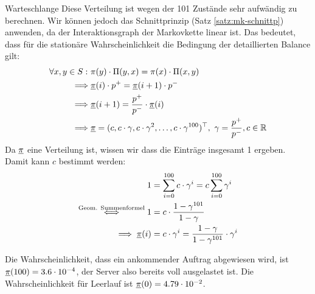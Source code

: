 \begin{example}{Warteschlange}{}
Diese Verteilung ist wegen der 101 Zustände sehr aufwändig zu berechnen. Wir
können jedoch das Schnittprinzip (Satz \ref{satz:mk-schnittp}) anwenden, da der
Interaktionsgraph der Markovkette linear ist. Das bedeutet, dass für die
stationäre Wahrscheinlichkeit die Bedingung der detaillierten Balance gilt:
\begin{align*}
\forall x,y\in S:\ &\pi(y)\cdot\Pi(y,x) = \pi(x)\cdot\Pi(x,y) \\
\implies&\underline{\pi}(i)\cdot p^+ = \underline{\pi}(i+1)\cdot p^- \\
\implies&\underline{\pi}(i+1) = \frac{p^+}{p^-}\cdot\underline{\pi}(i) \\
\implies&\underline{\pi} = (c, c\cdot\gamma,c\cdot\gamma^2,\ldots,
c\cdot\gamma^{100})^{\top},\ \gamma = \frac{p^+}{p^-}, c\in\mathbb{R}
\end{align*}
Da $\underline{\pi}$ eine Verteilung ist, wissen wir dass die Einträge insgesamt 1
ergeben. Damit kann $c$ bestimmt werden:
\begin{align*}
1 &= \sum_{i=0}^{100}c\cdot\gamma^i = c \sum_{i=0}^{100}\gamma^i \\
\overset{\text{Geom. Summenformel}}{\iff} 1 &= c\cdot\frac{1-\gamma^{101}}{1-\gamma} \\
\implies \underline{\pi}(i) &= c\cdot\gamma^i = \frac{1-\gamma}{1-\gamma^{101}}\cdot \gamma^i
\end{align*}

Die Wahrscheinlichkeit, dass ein ankommender Auftrag abgewiesen wird, ist
$\underline{\pi}(100)=3.6\cdot10^{-4}$, der Server also bereits voll ausgelastet ist. Die
Wahrscheinlichkeit für Leerlauf ist $\underline{\pi}(0) = 4.79\cdot10^{-2}$.
\end{example}

